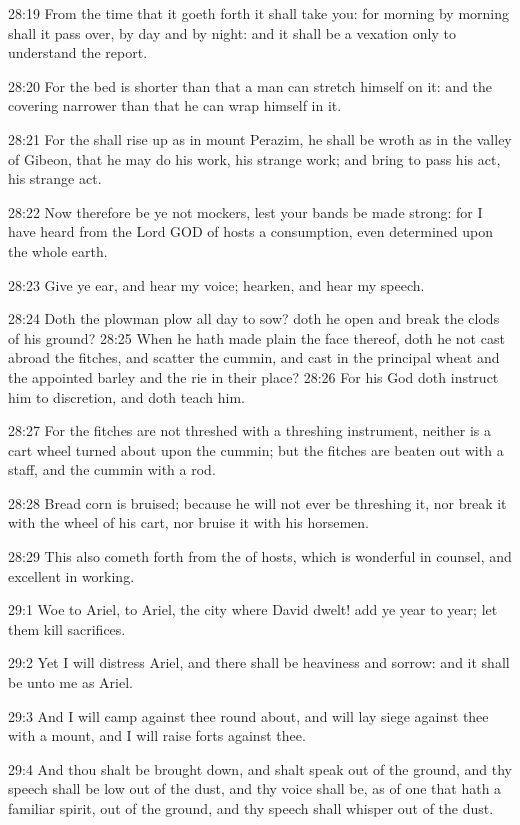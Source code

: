 28:19 From the time that it goeth forth it shall take you: for morning by morning shall it pass over, by day and by night: and it shall be a vexation only to understand the report.

28:20 For the bed is shorter than that a man can stretch himself on it: and the covering narrower than that he can wrap himself in it.

28:21 For the \LORD shall rise up as in mount Perazim, he shall be wroth as in the valley of Gibeon, that he may do his work, his strange work; and bring to pass his act, his strange act.

28:22 Now therefore be ye not mockers, lest your bands be made strong: for I have heard from the Lord GOD of hosts a consumption, even determined upon the whole earth.

28:23 Give ye ear, and hear my voice; hearken, and hear my speech.

28:24 Doth the plowman plow all day to sow? doth he open and break the clods of his ground?  28:25 When he hath made plain the face thereof, doth he not cast abroad the fitches, and scatter the cummin, and cast in the principal wheat and the appointed barley and the rie in their place?  28:26 For his God doth instruct him to discretion, and doth teach him.

28:27 For the fitches are not threshed with a threshing instrument, neither is a cart wheel turned about upon the cummin; but the fitches are beaten out with a staff, and the cummin with a rod.

28:28 Bread corn is bruised; because he will not ever be threshing it, nor break it with the wheel of his cart, nor bruise it with his horsemen.

28:29 This also cometh forth from the \LORD of hosts, which is wonderful in counsel, and excellent in working.

29:1 Woe to Ariel, to Ariel, the city where David dwelt! add ye year to year; let them kill sacrifices.

29:2 Yet I will distress Ariel, and there shall be heaviness and sorrow: and it shall be unto me as Ariel.

29:3 And I will camp against thee round about, and will lay siege against thee with a mount, and I will raise forts against thee.

29:4 And thou shalt be brought down, and shalt speak out of the ground, and thy speech shall be low out of the dust, and thy voice shall be, as of one that hath a familiar spirit, out of the ground, and thy speech shall whisper out of the dust.

